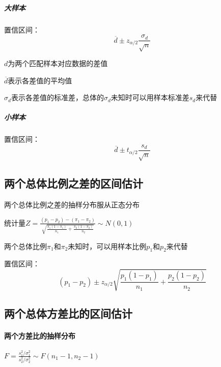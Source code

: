 \documentclass[UTF8,10pt]{book}
\begin{document}
                        \subparagraph{大样本}
                        {\kaishu 置信区间：}
                        $$ \overline{d} \pm z_{\alpha/2} \frac{\sigma_d}{\sqrt{n}} $$

                            {\kaishu $d$为两个匹配样本对应数据的差值
                            
                            $\overline{d}$表示各差值的平均值
                            
                            $\sigma_d$表示各差值的标准差，总体的$\sigma_d$未知时可以用样本标准差$s_d$来代替}

                        \subparagraph{小样本}
                        {\kaishu 置信区间：}
                        $$ \overline{d} \pm t_{\alpha/2} \frac{s_d}{\sqrt{n}} $$


            \subsection{两个总体比例之差的区间估计}

                        {\kaishu 两个总体比例之差的抽样分布服从正态分布
                        
                        统计量$  Z = \frac{(p_1 - p_2)- (\pi_1 - \pi_2)}{  \sqrt{  \frac{\pi_1(1-\pi_1)}{n_1} + \frac{\pi_2(1-\pi_2)}{n_2} }  }  \sim N(0,1)$}



                        {\kaishu 两个总体比例$\pi_1$和$\pi_2$未知时，可以用样本比例$p_1$和$p_2$来代替}

                        {\kaishu 置信区间：}
                        $$   (p_1 - p_2) \pm z_{\alpha / 2}  \sqrt{  \frac{p_1(1-p_1)}{n_1}  +  \frac{p_2(1-p_2)}{n_2}  }  $$


            \subsection{两个总体方差比的区间估计}
                
                \paragraph{两个方差比的抽样分布} $  F = \frac{  s_1^2 / \sigma_1^2  }{  s_2^2 / \sigma_2^2  } \sim F(n_1-1,n_2-1) $
                    
\end{document}
